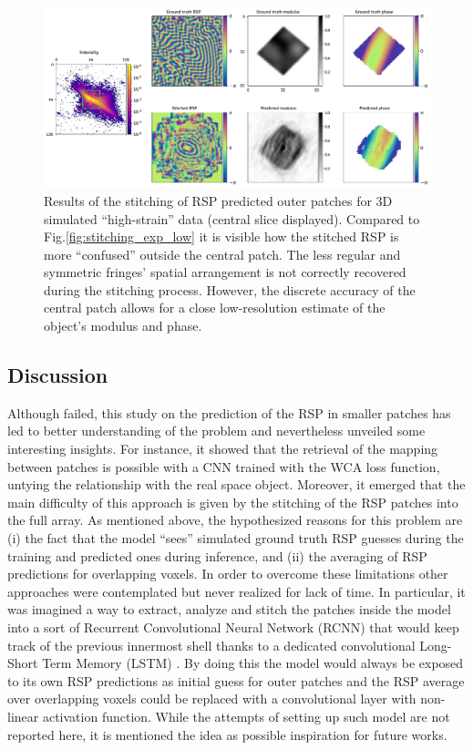 \begin{figure}[H]
    \centering
    \includegraphics[width=\textwidth]{figures/Phasing/stitching_high_strain_sim.pdf}
    \caption{Results of the stitching of RSP predicted outer patches for 3D simulated ``high-strain'' data (central 
    slice displayed). Compared to Fig.\ref{fig:stitching_exp_low} it is visible how the stitched RSP is more ``confused'' 
    outside the central patch. The less regular and symmetric fringes' spatial arrangement is not correctly recovered 
    during the stitching process. However, the discrete accuracy of the central patch allows for a close low-resolution 
    estimate of the object's modulus and phase. 
    }
    \label{fig:stitching_highstrain}
\end{figure}

\subsection{Discussion}
Although failed, this study on the prediction of the RSP in smaller patches has led to better understanding of the problem 
and nevertheless unveiled some interesting insights. For instance, it showed that the retrieval of the mapping between patches 
is possible with a CNN trained with the WCA loss function, untying the relationship with the real space object. 
Moreover, it emerged that the main difficulty of this approach is given by the stitching of the RSP patches into the full 
array. As mentioned above, the hypothesized reasons for this problem are (i) the fact that the model ``sees'' 
simulated ground truth RSP guesses during the training and predicted ones during inference, and (ii) the averaging 
of RSP predictions for overlapping voxels. In order to overcome these limitations other approaches were contemplated but 
never realized for lack of time. In particular, it was imagined a way to extract, analyze and stitch the patches inside the 
model into a sort of Recurrent Convolutional Neural Network (RCNN) that would keep track of the previous innermost shell
thanks to a dedicated convolutional Long-Short Term Memory (LSTM) \cite{shi2015convolutionallstmnetworkmachine}. By doing 
this the model would always be exposed to its own RSP predictions as initial guess for outer patches and the RSP average over
overlapping voxels could be replaced with a convolutional layer with non-linear activation function. While the attempts 
of setting up such model are not reported here, it is mentioned the idea as possible inspiration for future works. \\

